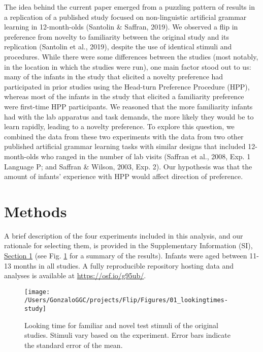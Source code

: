 \documentclass[english,man,man,floatsintext]{apa6}
\begin{document}
The idea behind the current paper emerged from a puzzling pattern of results in a replication of a published study focused on non-linguistic artificial grammar learning in 12-month-olds (Santolin \& Saffran, 2019). We observed a flip in preference from novelty to familiarity between the original study and its replication (Santolin et al., 2019), despite the use of identical stimuli and procedures. While there were some differences between the studies (most notably, in the location in which the studies were run), one main factor stood out to us: many of the infants in the study that elicited a novelty preference had participated in prior studies using the Head-turn Preference Procedure (HPP), whereas most of the infants in the study that elicited a familiarity preference were first-time HPP participants. We reasoned that the more familiarity infants had with the lab apparatus and task demands, the more likely they would be to learn rapidly, leading to a novelty preference. To explore this question, we combined the data from these two experiments with the data from two other published artificial grammar learning tasks with similar designs that included 12-month-olds who ranged in the number of lab visits (Saffran et al., 2008, Exp. 1 Language P; and Saffran \& Wilson, 2003, Exp. 2). Our hypothesis was that the amount of infants' experience with HPP would affect direction of preference.

\hypertarget{methods}{%
\section{Methods}\label{methods}}

A brief description of the four experiments included in this analysis, and our rationale for selecting them, is provided in the Supplementary Information (SI), \protect\hyperlink{s1}{Section 1} (see Fig. \ref{fig:fig1} for a summary of the results). Infants were aged between 11-13 months in all studies. A fully reproducible repository hosting data and analyses is available at \url{https://osf.io/g95ub/}.

\begin{figure}
\texttt{[image: /Users/GonzaloGGC/projects/Flip/Figures/01\_lookingtimes-study]} \caption{Looking time for familiar and novel test stimuli of the original studies. Stimuli vary based on the experiment. Error bars indicate the standard error of the mean.}\label{fig:fig1}
\end{figure}
\end{document}
